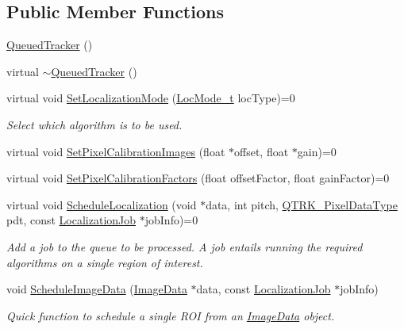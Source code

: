 \subsection*{Public Member Functions}
\begin{DoxyCompactItemize}
\item 
\hyperlink{class_queued_tracker_a483d1506b7b317d705cc7997805b5904}{Queued\+Tracker} ()
\item 
virtual \hyperlink{class_queued_tracker_aa60a3ac6e97b8a7a84b49dd9b6c8b615}{$\sim$\+Queued\+Tracker} ()
\item 
virtual void \hyperlink{class_queued_tracker_aed430b5578d7a3e75f4d4d6c6dbb7e45}{Set\+Localization\+Mode} (\hyperlink{qtrk__c__api_8h_a6ba72ec1daa19642f85a47defe8f0812}{Loc\+Mode\+\_\+t} loc\+Type)=0
\begin{DoxyCompactList}\small\item\em Select which algorithm is to be used. \end{DoxyCompactList}\item 
virtual void \hyperlink{class_queued_tracker_ae1fa56f8629d8d4ad621889fbd9e4a46}{Set\+Pixel\+Calibration\+Images} (float $\ast$offset, float $\ast$gain)=0
\item 
virtual void \hyperlink{class_queued_tracker_ab9dd540b5c8452718944b47520fda402}{Set\+Pixel\+Calibration\+Factors} (float offset\+Factor, float gain\+Factor)=0
\item 
virtual void \hyperlink{class_queued_tracker_a233dffd15fe3cef8a53c698bba9befb4}{Schedule\+Localization} (void $\ast$data, int pitch, \hyperlink{qtrk__c__api_8h_aad82367b3ea592a142bb50a2fb538b0b}{Q\+T\+R\+K\+\_\+\+Pixel\+Data\+Type} pdt, const \hyperlink{struct_localization_job}{Localization\+Job} $\ast$job\+Info)=0
\begin{DoxyCompactList}\small\item\em Add a job to the queue to be processed. A job entails running the required algorithms on a single region of interest. \end{DoxyCompactList}\item 
void \hyperlink{class_queued_tracker_afa6cfa13cba4d05fac9f7baa96b12f89}{Schedule\+Image\+Data} (\hyperlink{_queued_tracker_8h_a2d6726594ce64e82b9222b183f2571d1}{Image\+Data} $\ast$data, const \hyperlink{struct_localization_job}{Localization\+Job} $\ast$job\+Info)
\begin{DoxyCompactList}\small\item\em Quick function to schedule a single R\+OI from an \hyperlink{utils_8h_a2d6726594ce64e82b9222b183f2571d1}{Image\+Data} object. \end{DoxyCompactList}\item 

\end{DoxyCompactItemize}
